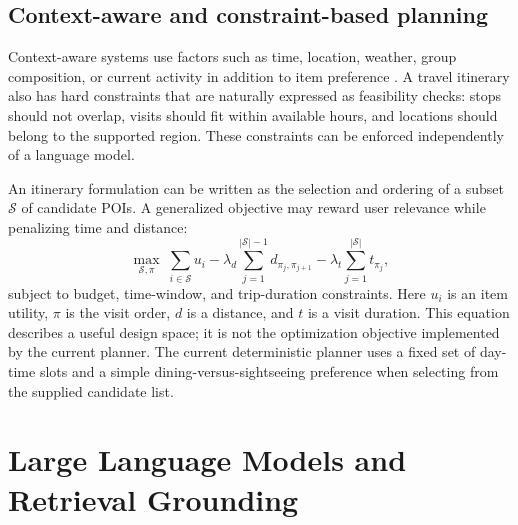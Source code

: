 \subsection{Context-aware and constraint-based planning}

Context-aware systems use factors such as time, location, weather, group composition, or current activity in addition to item preference \cite{gavalas2014mobile}. A travel itinerary also has hard constraints that are naturally expressed as feasibility checks: stops should not overlap, visits should fit within available hours, and locations should belong to the supported region. These constraints can be enforced independently of a language model.

An itinerary formulation can be written as the selection and ordering of a subset $\mathcal{S}$ of candidate POIs. A generalized objective may reward user relevance while penalizing time and distance:
\begin{equation}
    \max_{\mathcal{S},\pi}\;
    \sum_{i\in\mathcal{S}} u_i
    - \lambda_d\sum_{j=1}^{|\mathcal{S}|-1} d_{\pi_j,\pi_{j+1}}
    - \lambda_t\sum_{j=1}^{|\mathcal{S}|} t_{\pi_j},
\end{equation}
subject to budget, time-window, and trip-duration constraints. Here $u_i$ is an item utility, $\pi$ is the visit order, $d$ is a distance, and $t$ is a visit duration. This equation describes a useful design space; it is not the optimization objective implemented by the current planner. The current deterministic planner uses a fixed set of day-time slots and a simple dining-versus-sightseeing preference when selecting from the supplied candidate list.

\section{Large Language Models and Retrieval Grounding}

